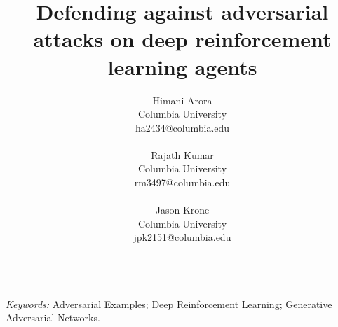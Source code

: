\documentclass[12pt]{article}
\title{%
\textbf{Defending against adversarial attacks on deep reinforcement learning agents}
}
\author{
Himani Arora \\
Columbia University \\
ha2434@columbia.edu \\
\\
Rajath Kumar\\
Columbia University\\
rm3497@columbia.edu\\
\\
Jason Krone\\
Columbia University \\
jpk2151@columbia.edu \\
\\
}
\begin{document}
\maketitle
\bigskip



\emph{Keywords:}
Adversarial Examples;
Deep Reinforcement Learning;
Generative Adversarial Networks.

\clearpage
\glsresetall{}

%

\clearpage












\clearpage

%




\clearpage
\appendix

%
\end{document}
